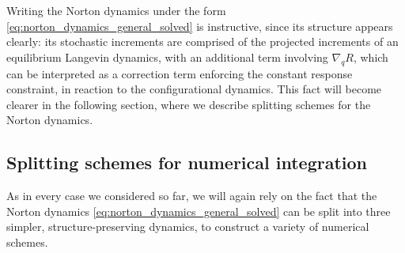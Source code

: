 Writing the Norton dynamics under the form \eqref{eq:norton_dynamics_general_solved} is instructive, since its structure appears clearly: its stochastic increments are comprised of the projected increments of an equilibrium Langevin dynamics, 
with an additional term involving $\nabla_q R$, which can be interpreted as a correction term enforcing the constant response constraint, in reaction to the configurational dynamics.
This fact will become clearer in the following section, where we describe splitting schemes for the Norton dynamics.

\subsection{Splitting schemes for numerical integration}
As in every case we considered so far, we will again rely on the fact that the Norton dynamics \eqref{eq:norton_dynamics_general_solved} can be split into three simpler, structure-preserving dynamics, to construct a variety of numerical schemes.
